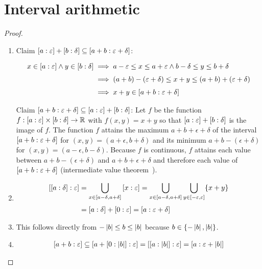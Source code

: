 \section{Interval arithmetic}



\begin{proof} ~
  \begin{enumerate}
    \item Claim $\an[\epsilon]{a} + \an[\delta]{b} \subseteq \an[\epsilon+\delta]{a+b}$:

      \begin{align}
        x \in \an[\epsilon]{a} \land y \in \an[\delta]{b} & \implies a-\epsilon \le x \le a+\epsilon \land b-\delta \le y \le b+\delta \nl
        & \implies (a+b)-(\epsilon + \delta) \le x+y \le (a+b)+(\epsilon + \delta) \nl
        & \implies x+y \in \an[\epsilon+\delta]{a+b}
      \end{align}

      Claim $\an[\epsilon+\delta]{a+b} \subseteq \an[\epsilon]{a} + \an[\delta]{b}$: Let $f$ be the function $f: \an[\epsilon]{a} \times \an[\delta]{b} \to \R$ with $f(x,y) =x+y$ so that $\an[\epsilon]{a} + \an[\delta]{b}$ is the image of $f$. The function $f$ attains the maximum $a+b+\epsilon+\delta$ of the interval $\an[\epsilon+\delta]{a+b}$ for $(x,y) = \left(a+\epsilon,b+\delta\right)$ and its minimum $a+b-(\epsilon+\delta)$ for $(x,y)=\left(a-\epsilon,b-\delta\right)$. Because $f$ is continuous, $f$ attains each value between $a+b-(\epsilon+\delta)$ and $a+b+\epsilon+\delta$ and therefore each value of $\an[\epsilon+\delta]{a+b}$ (intermediate value theorem~\cite{wiki:intermediatevaluetheorem}).
    \item

      \begin{align}
        \an[\epsilon]{\an[\delta]{a}} & = \bigcup_{x\in \interval{a-\delta}{a+\delta}} \an[\epsilon]{x} = \bigcup_{x\in\interval{a-\delta}{a+\delta}} \bigcup_{y\in\interval{-\epsilon}{\epsilon}} \{x+y\} \nl
        &= \an[\delta]{a} + \an[\epsilon]{0} = \an[\epsilon+\delta]{a}
      \end{align}
 
    \item

      This follows directly from $-\abs{b} \le b \le \abs{b}$ because $b \in \{-\abs{b}, \abs{b}\}$.

    \item

      \begin{align}
        \an[\epsilon]{a+b} \subseteq \an[\epsilon]{a+\an[\abs{b}]{0}} = \an[\epsilon]{\an[\abs{b}]{a}} = \an[\epsilon+\abs{b}]{a}
      \end{align}


\end{enumerate}
\end{proof}
